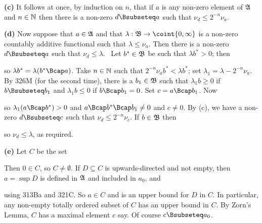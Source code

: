 {{\bf (c)} It follows at once, by induction on $n$, that if $a$ is any
non-zero element of $\frak A$ and $n\in\Bbb N$ then there is a non-zero
$d\Bsubseteq a$ such that $\nu_d\le 2^{-n}\nu_a$.

\medskip

{\bf (d)}
Now suppose that $a\in\frak A$ and that $\lambda:\frak B\to\coint{0,\infty}$ is a
non-zero countably additive functional such that $\lambda\le\nu_a$.   Then there is a
non-zero $d\Bsubseteq a$ such that $\nu_d\le\lambda$.   \Prf\ Let $b^*\in\frak B$ be
such that $\lambda b^*>0$;  then


\noindent so $\lambda b^*=\lambda(b^*\Bcap a)$.   Take $n\in\Bbb N$ such that
$2^{-n}\nu_ab^*<\lambda b^*$;  set $\lambda_1=\lambda-2^{-n}\nu_a$.   
By 326M (for the
second time), there is a $b_1\in\frak B$ such that $\lambda_1b\ge 0$ if
$b\Bsubseteq b_1$ and $\lambda_1b\le 0$ if $b\Bcap b_1=0$.   Set $c=a\Bcap b_1$.
Now


\noindent so $\lambda_1(a\Bcap b^*)>0$ and $a\Bcap b^*\Bcap b_1\ne 0$ and $c\ne 0$.
By (c), we have a non-zero $d\Bsubseteq c$ such that $\nu_d\le 2^{-n}\nu_c$.
If $b\in\frak B$ then


\noindent so $\nu_d\le\lambda$, as required.\ \Qed

\medskip

{\bf (e)} Let $C$ be the set


\noindent Then $0\in C$, so $C\ne\emptyset$.    If $D\subseteq C$ is
upwards-directed and not empty, then $a=\sup D$ is defined in $\frak A$ and
included in $a_0$, and


\noindent  using 313Ba and 321C.   So $a\in C$ and is an upper bound for
$D$ in $C$.   In particular, any non-empty totally ordered subset of $C$
has an upper bound in $C$.   By Zorn's Lemma, $C$ has a maximal element
$c$ say.   Of course $c\Bsubseteq a_0$.

}
